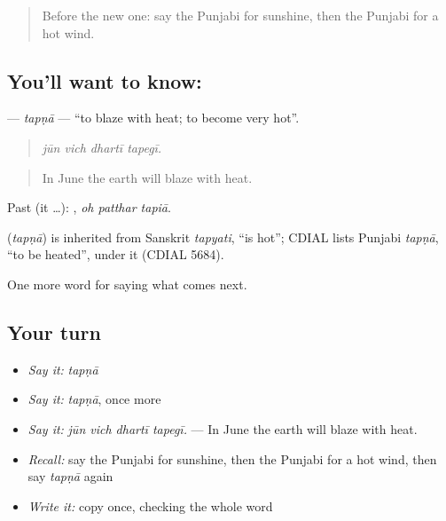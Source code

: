 \begin{quote}
Before the new one: say the Punjabi for sunshine, then the Punjabi for a hot wind.
\end{quote}

\subsection*{You'll want to know: }
\textbf{} — \emph{tapṇā} — \textquotedblleft{}to blaze with heat; to become very hot\textquotedblright{}.

\begin{quote}
   
\end{quote}

\begin{quote}
\emph{jūn vich dhartī tapegī.}
\end{quote}

\begin{quote}
In June the earth will blaze with heat.
\end{quote}

Past (it …):   , \emph{oh patthar tapiā}.

\begin{cousinweb}
\textbf{} (\emph{tapṇā}) is inherited from Sanskrit \emph{tapyati}, \textquotedblleft{}is hot\textquotedblright{}; CDIAL lists Punjabi \emph{tapṇā}, \textquotedblleft{}to be heated\textquotedblright{}, under it (CDIAL 5684).
\end{cousinweb}

\begin{grammarlens}[title={What you've built}]
One more word for saying what comes next.
\end{grammarlens}

\subsection*{Your turn}
\begin{itemize}
\raggedright
  \item \emph{Say it:} \emph{tapṇā}
  \item \emph{Say it:} \emph{tapṇā}, once more
  \item \emph{Say it:} \emph{jūn vich dhartī tapegī.} — In June the earth will blaze with heat.
  \item \emph{Recall:} say the Punjabi for sunshine, then the Punjabi for a hot wind, then say \emph{tapṇā} again
  \item \emph{Write it:} copy \textbf{} once, checking the whole word
\end{itemize}

